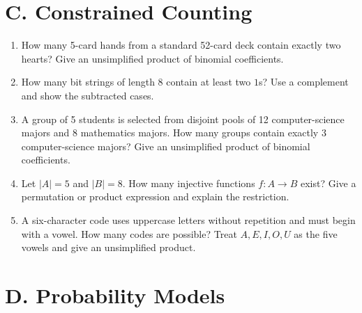 \section*{C. Constrained Counting}

\begin{enumerate}[label=\textbf{C.\arabic*.}]
    \item How many 5-card hands from a standard 52-card deck contain exactly
    two hearts? Give an unsimplified product of binomial coefficients.

    \item How many bit strings of length 8 contain at least two $1$s? Use a
    complement and show the subtracted cases.

    \item A group of 5 students is selected from disjoint pools of 12
    computer-science majors and 8 mathematics majors. How many groups contain exactly 3 computer-science
    majors? Give an unsimplified product of binomial coefficients.

    \item Let $|A|=5$ and $|B|=8$. How many injective functions $f:A\to B$
    exist? Give a permutation or product expression and explain the restriction.

    \item A six-character code uses uppercase letters without repetition and
    must begin with a vowel. How many codes are possible? Treat
    $A,E,I,O,U$ as the five vowels and give an unsimplified product.
\end{enumerate}

\section*{D. Probability Models}

